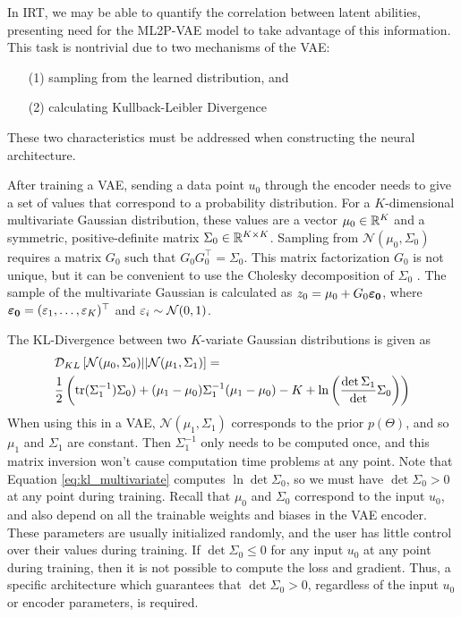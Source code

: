 In IRT, we may be able to quantify the correlation between latent abilities, presenting need for the ML2P-VAE model to take advantage of this information. This task is nontrivial due to two mechanisms of the VAE:
\begin{itemize}
  \item[(1)] sampling from the learned distribution, and
  \item[(2)] calculating Kullback-Leibler Divergence
\end{itemize}
These two characteristics must be addressed when constructing the neural architecture.

After training a VAE, sending a data point $u_0$ through the encoder needs to give a set of values that correspond to a probability distribution. For a $K$-dimensional multivariate Gaussian distribution, these values are a vector $\mu_0 \in \mathbb{R}^K$ and a symmetric, positive-definite matrix $\Sigma_0 \in \mathbb{R}^{K\times K}$. Sampling from $\mathcal{N}(\mu_0, \Sigma_0)$ requires a matrix $G_0$ such that $G_0 G_0^\top = \Sigma_0$. This matrix factorization $G_0$ is not unique, but it can be convenient to use the Cholesky decomposition of $\Sigma_0$ \cite{atkinson}. The sample of the multivariate Gaussian is calculated as $z_0 = \mu_0 + G_0 \boldsymbol{\varepsilon_0}$, where $\boldsymbol{\varepsilon_0} = (\varepsilon_1, \ldots, \varepsilon_K)^\top$ and $\varepsilon_i \sim \mathcal{N}(0,1)$. 

The KL-Divergence between two $K$-variate Gaussian distributions is given as
\begin{equation}
\begin{split}
  &\mathcal{D}_{KL}\left[\mathcal{N}(\mu_0, \Sigma_0) || \mathcal{N}(\mu_1, \Sigma_1) \right] = \\
&\frac{1}{2} \left( \text{tr}(\Sigma_1^{-1}) \Sigma_0) + (\mu_1 - \mu_0) \Sigma_1^{-1} (\mu_1 - \mu_0) - K + \ln\left( \frac{\det \Sigma_1}\det \Sigma_0 \right) \right)
  \label{eq:kl_multivariate}
\end{split}
\end{equation}
When using this in a VAE, $\mathcal{N}(\mu_1, \Sigma_1)$ corresponds to the prior $p(\Theta)$, and so $\mu_1$ and $\Sigma_1$ are constant. Then $\Sigma_1^{-1}$ only needs to be computed once, and this matrix inversion won't cause computation time problems at any point. Note that Equation \ref{eq:kl_multivariate} computes $\ln \det \Sigma_0$, so we must have $\det \Sigma_0 > 0$ at any point during training. Recall that $\mu_0$ and $\Sigma_0$ correspond to the input $u_0$, and also depend on all the trainable weights and biases in the VAE encoder. These parameters are usually initialized randomly, and the user has little control over their values during training. If $\det \Sigma_0 \leq 0$ for any input $u_0$ at any point during training, then it is not possible to compute the loss and gradient. Thus, a specific architecture which guarantees that $\det \Sigma_0 > 0$, regardless of the input $u_0$ or encoder parameters, is required.

